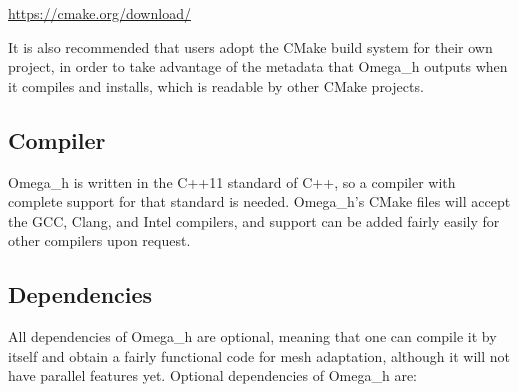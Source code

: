 \documentclass{article}
\begin{document}
\url{https://cmake.org/download/}

It is also recommended that users adopt the CMake build
system for their own project, in order to take advantage
of the metadata that Omega\_h outputs when it compiles
and installs, which is readable by other CMake projects.

\subsection{Compiler}

Omega\_h is written in the C++11 standard of C++,
so a compiler with complete support for that standard
is needed.
Omega\_h's CMake files will accept the GCC, Clang,
and Intel compilers, and support can be added
fairly easily for other compilers upon request.

\subsection{Dependencies}

All dependencies of Omega\_h are optional,
meaning that one can compile it by itself and obtain a fairly
functional code for mesh adaptation, although
it will not have parallel features yet.
Optional dependencies of Omega\_h are:
\end{document}
